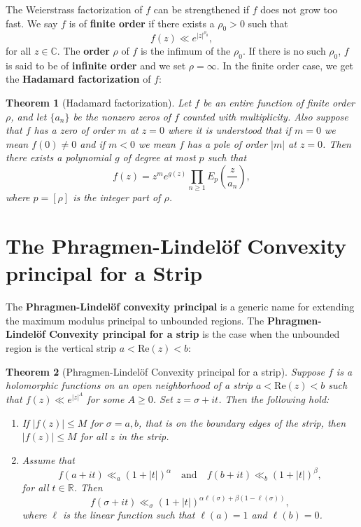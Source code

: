 \documentclass[12pt]{book}
\newtheorem{theorem}{Theorem}[section]
\theoremstyle{definition}\newframedtheorem{method}{Method}
\newcommand{\R}{\mathbb{R}}
\newcommand{\C}{\mathbb{C}}
\renewcommand{\a}{\alpha}
\renewcommand{\b}{\beta}
\newcommand{\s}{\sigma}
\newcommand{\<}{\langle}
\renewcommand{\>}{\rangle}
\renewcommand{\Re}{\mathrm{Re}}
\begin{document}
    The Weierstrass factorization of $f$ can be strengthened if $f$ does not grow too fast. We say $f$ is of \textbf{finite order} if there exists a $\rho_{0} > 0$ such that
    \[
      f(z) \ll e^{|z|^{\rho_{0}}},
    \]
    for all $z \in \C$. The \textbf{order} $\rho$ of $f$ is the infimum of the $\rho_{0}$. If there is no such $\rho_{0}$, $f$ is said to be of \textbf{infinite order} and we set $\rho = \infty$. In the finite order case, we get the \textbf{Hadamard factorization} of $f$:

    \begin{theorem}[Hadamard factorization]
      Let $f$ be an entire function of finite order $\rho$, and let $\{a_{n}\}$ be the nonzero zeros of $f$ counted with multiplicity. Also suppose that $f$ has a zero of order $m$ at $z = 0$ where it is understood that if $m = 0$ we mean $f(0) \neq 0$ and if $m < 0$ we mean $f$ has a pole of order $|m|$ at $z = 0$. Then there exists a polynomial $g$ of degree at most $p$ such that
      \[
        f(z) = z^{m}e^{g(z)}\prod_{n \ge 1}E_{p}\left(\frac{z}{a_{n}}\right),
      \]
      where $p = [\rho]$ is the integer part of $\rho$.
    \end{theorem}
  \section{The Phragmen-Lindel\"of Convexity principal for a Strip}\label{append:The_Phragmen_Lindelof_Convexity_principal}
    The \textbf{Phragmen-Lindel\"of convexity principal} is a generic name for extending the maximum modulus principal to unbounded regions. The \textbf{Phragmen-Lindel\"of Convexity principal for a strip} is the case when the unbounded region is the vertical strip $a < \Re(z) < b$:

    \begin{theorem}[Phragmen-Lindel\"of Convexity principal for a strip]\label{thm:Phragmen-Lindelof_convexity_principal}
      Suppose $f$ is a holomorphic functions on an open neighborhood of a strip $a < \Re(z) < b$ such that $f(z) \ll e^{|z|^{A}}$ for some $A \ge 0$. Set $z = \s+it$. Then the following hold:
      \begin{enumerate}[label=(\roman*)]
        \item If $|f(z)| \le M$ for $\s = a,b$, that is on the boundary edges of the strip, then $|f(z)| \le M$ for all $z$ in the strip.
        \item Assume that
        \[
          f(a+it) \ll_{a} (1+|t|)^{\a} \quad \text{and} \quad f(b+it) \ll_{b} (1+|t|)^{\b},
        \]
        for all $t \in \R$. Then
        \[
          f(\s+it) \ll_{\s} (1+|t|)^{\a\ell(\s)+\b(1-\ell(\s))},
        \]
        where $\ell$ is the linear function such that $\ell(a) = 1$ and $\ell(b) = 0$.
      \end{enumerate}
    \end{theorem}
\end{document}
